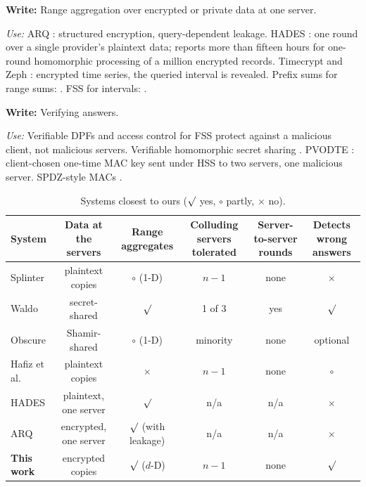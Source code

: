\documentclass[a4paper,fleqn]{cas-sc}
\providecommand{\checkmark}{\ensuremath{\surd}}
\newif\ifskeleton \skeletontrue          %
\newcommand{\para}[2]{\ifskeleton\begin{parabox}\textbf{Write:} #1
  \par\smallskip\textit{Use:} #2\end{parabox}\fi}
\begin{document}
\para{Range aggregation over encrypted or private data at one server.}{ARQ
\citep{espiritu2022arq}: structured encryption, query-dependent leakage. HADES
\citep{liu2025hades}: one round over a single provider's plaintext data; reports
more than fifteen hours for one-round homomorphic processing of a million
encrypted records. Timecrypt \citep{timecrypt} and Zeph \citep{zeph}: encrypted
time series, the queried interval is revealed. Prefix sums for range sums:
\citep{ho1997range,crow1984summed}. FSS for intervals: \citep{boyle2016function}.}

\para{Verifying answers.}{Verifiable DPFs \citep{decastro2022lightweight} and
access control for FSS \citep{pacl,ji2023finegrained} protect against a
malicious client, not malicious servers. Verifiable homomorphic secret sharing
\citep{choudhuri2024vehss}. PVODTE \citep{li2026silent}: client-chosen one-time
MAC key sent under HSS to two servers, one malicious server. SPDZ-style MACs
\citep{damgard2012spdz}.}

\begin{table}[pos=t,width=\textwidth]
\caption{Systems closest to ours ($\checkmark$ yes, $\circ$ partly, $\times$ no).}
\label{tab:compare}
\centering
\footnotesize
\setlength{\tabcolsep}{4pt}
\begin{tabular*}{\tblwidth}{@{\extracolsep{\fill}}lccccc@{}}
\toprule
System & Data at the servers & Range aggregates & Colluding servers tolerated & Server-to-server rounds & Detects wrong answers \\
\midrule
Splinter \citep{splinter} & plaintext copies & $\circ$ (1-D) & $n-1$ & none & $\times$ \\
Waldo \citep{waldo} & secret-shared & $\checkmark$ & 1 of 3 & yes & $\checkmark$ \\
Obscure \citep{gupta2020obscure} & Shamir-shared & $\circ$ (1-D) & minority & none & optional \\
Hafiz et al.\ \citep{hafiz2024private} & plaintext copies & $\times$ & $n-1$ & none & $\circ$ \\
HADES \citep{liu2025hades} & plaintext, one server & $\checkmark$ & n/a & n/a & $\times$ \\
ARQ \citep{espiritu2022arq} & encrypted, one server & $\checkmark$ (with leakage) & n/a & n/a & $\times$ \\
\midrule
\textbf{This work} & encrypted copies & $\checkmark$ ($d$-D) & $n-1$ & none & $\checkmark$ \\
\bottomrule
\end{tabular*}
\end{table}
\end{document}
